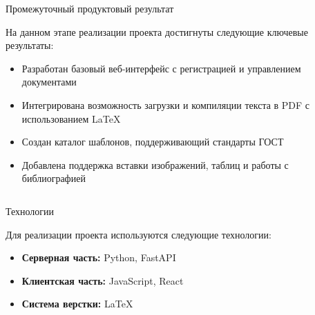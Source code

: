 \documentclass[final]{beamer}
\newlength{\onecolwid}
\newlength{\twocolwid}
\begin{document}
\begin{frame}[t]
\begin{columns}[t]
\begin{column}{\twocolwid}
\begin{columns}[t,totalwidth=\twocolwid]
\end{columns} %


\begin{alertblock}{Промежуточный продуктовый результат}

На данном этапе реализации проекта достигнуты следующие ключевые результаты:
\begin{itemize}
\item Разработан базовый веб-интерфейс с регистрацией и управлением документами
\item Интегрирована возможность загрузки и компиляции текста в PDF с использованием LaTeX
\item Создан каталог шаблонов, поддерживающий стандарты ГОСТ
\item Добавлена поддержка вставки изображений, таблиц и работы с библиографией
\end{itemize}

\end{alertblock} 


\begin{columns}[t,totalwidth=\twocolwid] %

\begin{column}{\onecolwid} %


\begin{block}{Технологии}

Для реализации проекта используются следующие технологии:

\begin{itemize}
\item \textbf{Серверная часть:} Python, FastAPI
\item \textbf{Клиентская часть:} JavaScript, React
\item \textbf{Система верстки:} LaTeX
\end{itemize}


\end{block}
\end{column}
\end{columns}
\end{column}
\end{columns}
\end{frame}
\end{document}

